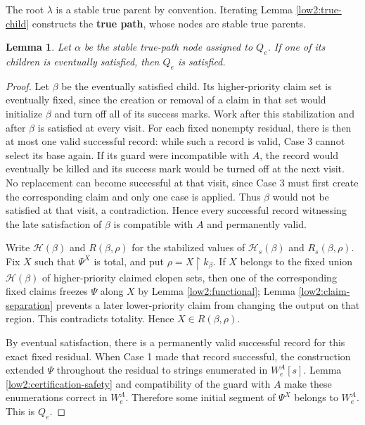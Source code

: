 \documentclass[11pt]{amsart}
\newtheorem{lemma}[theorem]{Lemma}
\begin{document}
The root $\lambda$ is a stable true parent by convention. Iterating Lemma
\ref{low2:true-child} constructs the \textbf{true path}, whose nodes
are stable true parents. 

\begin{lemma}\label{low2:satisfied-implies-q}
Let $\alpha$ be the stable true-path node assigned to $Q_e$. If one of its
children is eventually satisfied, then $Q_e$ is satisfied.
\end{lemma}

\begin{proof}
Let $\beta$ be the eventually satisfied child. Its higher-priority claim
set is eventually fixed, since the creation or removal of a claim in that set
would initialize $\beta$ and turn off all of its success marks. Work after
this stabilization and after $\beta$ is satisfied at every visit. For each
fixed nonempty residual, there is then at most one valid successful record:
while such a record is valid, Case 3 cannot select its base again. If its guard
were incompatible with $A$, the record would eventually be killed and its
success mark would be turned off at the next visit. No replacement can become
successful at that visit, since Case 3 must first create the corresponding
claim and only one case is applied. Thus $\beta$ would not be satisfied at
that visit, a contradiction. Hence every successful record witnessing the
late satisfaction of $\beta$ is compatible with $A$ and permanently valid.

Write $\mathcal H(\beta)$ and $R(\beta,\rho)$ for the stabilized values of
$\mathcal H_s(\beta)$ and $R_s(\beta,\rho)$. Fix $X$ such that $\Psi^X$ is
total, and put
$\rho=X\upharpoonright k_\beta$. If $X$ belongs to the fixed union
$\mathcal H(\beta)$ of higher-priority claimed clopen sets, then one of the
corresponding fixed claims freezes $\Psi$ along $X$ by Lemma
\ref{low2:functional}; Lemma \ref{low2:claim-separation} prevents a later
lower-priority claim from changing the output on that region. This
contradicts totality. Hence
$X\in R(\beta,\rho)$.

By eventual satisfaction, there is a permanently valid successful record for
this exact fixed residual. When Case 1 made that record successful,
the construction extended $\Psi$ throughout the residual to strings
enumerated in $W_e^A[s]$. Lemma \ref{low2:certification-safety} and
compatibility of the guard with $A$ make these enumerations correct in
$W_e^A$. Therefore some initial segment of $\Psi^X$ belongs to $W_e^A$. This
is $Q_e$.
\end{proof}
\end{document}
